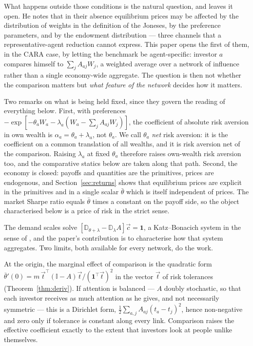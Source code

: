 \documentclass[12pt]{article}
\theoremstyle{definition}
\theoremstyle{remark}
\newcommand{\bth}{\bar\theta}
\newcommand{\D}{\mathbb{D}}
\begin{document}
What happens outside those conditions is the natural question, and \cite{gomez}
leaves it open. He notes that in their absence equilibrium prices may be
affected by the distribution of weights in the definition of the Joneses, by the
preference parameters, and by the endowment distribution --- three channels that
a representative-agent reduction cannot express. This paper opens the first of
them, in the CARA case, by letting the benchmark be agent-specific: investor $a$
compares himself to $\sum_jA_{aj}W_j$, a weighted average over a network of
influence rather than a single economy-wide aggregate. The question is then not
whether the comparison matters but \emph{what feature of the network} decides
how it matters.

Two remarks on what is being held fixed, since they govern the reading of
everything below. First, with preferences
$-\exp[-\theta_aW_a-\lambda_a(W_a-\sum_jA_{aj}W_j)]$, the coefficient of
absolute risk aversion in own wealth is $\alpha_a=\theta_a+\lambda_a$, not
$\theta_a$. We call $\theta_a$ \emph{net} risk aversion: it is the coefficient
on a common translation of all wealths, and it is risk aversion net of the
comparison. Raising $\lambda_a$ at fixed $\theta_a$ therefore raises own-wealth
risk aversion too, and the comparative statics below are taken along that path.
Second, the economy is closed: payoffs and quantities are the primitives,
prices are endogenous, and Section~\ref{sec:returns} shows that equilibrium
prices are explicit in the primitives and in a single scalar $\bth$ which is
itself independent of prices. The market Sharpe ratio equals $\bth$ times a
constant on the payoff side, so the object characterised below is a price of
risk in the strict sense.

The demand scales solve $[\D_{\theta+\lambda}-\D_{\lambda}A]\vec c=\mathbf 1$, a
Katz--Bonacich system in the sense of \cite{ballester}, and the paper's
contribution is to characterise how that system aggregates. Two limits, both
available for every network, do the work.

At the origin, the marginal effect of comparison is the quadratic form
$\bth'(0)=m\,\vec t^{\top}(\mathbb{I}-A)\vec t/(\mathbf 1^{\top}\vec t)^{2}$ in
the vector $\vec t$ of risk tolerances (Theorem~\ref{thm:deriv}). If attention
is balanced --- $A$ doubly stochastic, so that each investor receives as much
attention as he gives, and not necessarily symmetric --- this is a Dirichlet
form, $\tfrac12\sum_{a,j}A_{aj}(t_a-t_j)^{2}$, hence non-negative and zero only
if tolerance is constant along every link. Comparison raises the effective
coefficient exactly to the extent that investors look at people unlike
themselves.
\end{document}
